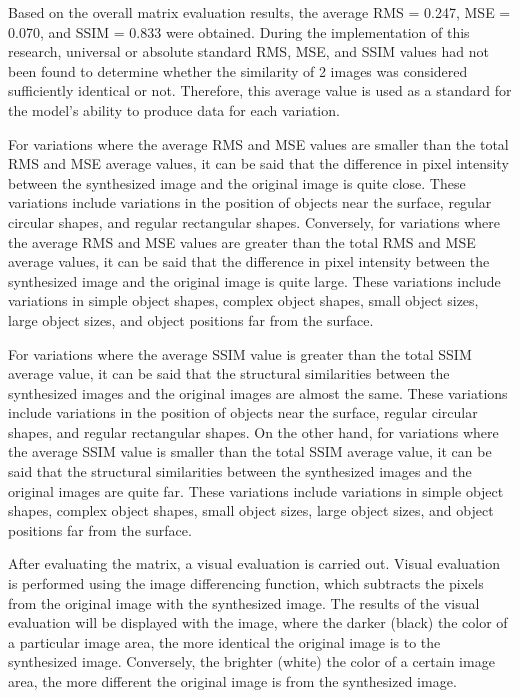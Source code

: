 \documentclass[conference]{IEEEtran}
\begin{document}
Based on the overall matrix evaluation results, the average RMS = 0.247, MSE = 0.070, and SSIM = 0.833 were obtained.
During the implementation of this research, universal or absolute standard RMS, MSE, and SSIM values had not been found to determine whether the similarity of 2 images was considered sufficiently identical or not.
Therefore, this average value is used as a standard for the model's ability to produce data for each variation.

For variations where the average RMS and MSE values are smaller than the total RMS and MSE average values, it can be said that the difference in pixel intensity between the synthesized image and the original image is quite close.
These variations include variations in the position of objects near the surface, regular circular shapes, and regular rectangular shapes.
Conversely, for variations where the average RMS and MSE values are greater than the total RMS and MSE average values, it can be said that the difference in pixel intensity between the synthesized image and the original image is quite large.
These variations include variations in simple object shapes, complex object shapes, small object sizes, large object sizes, and object positions far from the surface.

For variations where the average SSIM value is greater than the total SSIM average value, it can be said that the structural similarities between the synthesized images and the original images are almost the same.
These variations include variations in the position of objects near the surface, regular circular shapes, and regular rectangular shapes.
On the other hand, for variations where the average SSIM value is smaller than the total SSIM average value, it can be said that the structural similarities between the synthesized images and the original images are quite far.
These variations include variations in simple object shapes, complex object shapes, small object sizes, large object sizes, and object positions far from the surface.

After evaluating the matrix, a visual evaluation is carried out.
Visual evaluation is performed using the image differencing function, which subtracts the pixels from the original image with the synthesized image.
The results of the visual evaluation will be displayed with the image, where the darker (black) the color of a particular image area, the more identical the original image is to the synthesized image.
Conversely, the brighter (white) the color of a certain image area, the more different the original image is from the synthesized image.
\end{document}
